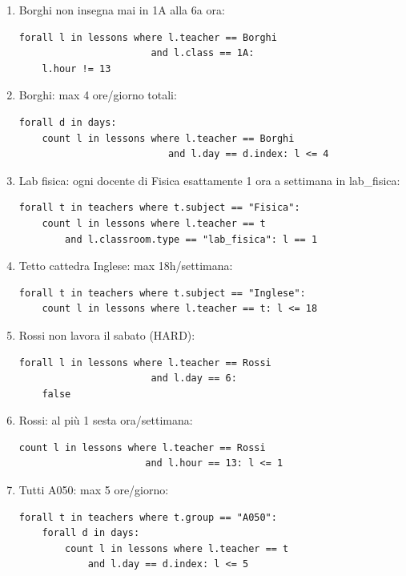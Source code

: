 \begin{enumerate}
\item Borghi non insegna mai in 1A alla 6a ora:
\begin{lstlisting}
forall l in lessons where l.teacher == Borghi
                       and l.class == 1A:
    l.hour != 13
\end{lstlisting}

\item Borghi: max 4 ore/giorno totali:
\begin{lstlisting}
forall d in days:
    count l in lessons where l.teacher == Borghi
                          and l.day == d.index: l <= 4
\end{lstlisting}

\item Lab fisica: ogni docente di Fisica esattamente 1 ora a
settimana in lab\_fisica:
\begin{lstlisting}
forall t in teachers where t.subject == "Fisica":
    count l in lessons where l.teacher == t
        and l.classroom.type == "lab_fisica": l == 1
\end{lstlisting}

\item Tetto cattedra Inglese: max 18h/settimana:
\begin{lstlisting}
forall t in teachers where t.subject == "Inglese":
    count l in lessons where l.teacher == t: l <= 18
\end{lstlisting}

\item Rossi non lavora il sabato (HARD):
\begin{lstlisting}
forall l in lessons where l.teacher == Rossi
                       and l.day == 6:
    false
\end{lstlisting}

\item Rossi: al pi\`u 1 sesta ora/settimana:
\begin{lstlisting}
count l in lessons where l.teacher == Rossi
                      and l.hour == 13: l <= 1
\end{lstlisting}

\item Tutti A050: max 5 ore/giorno:
\begin{lstlisting}
forall t in teachers where t.group == "A050":
    forall d in days:
        count l in lessons where l.teacher == t
            and l.day == d.index: l <= 5
\end{lstlisting}


\end{enumerate}

